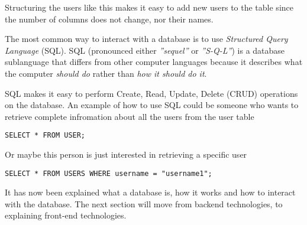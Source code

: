 \documentclass[../../master.tex]{subfiles}
\begin{document}
Structuring the users like this makes it easy to add new users to the table since the number of columns does not change, nor their names.

The most common way to interact with a database is to use \textit{Structured Query Language} (SQL).
SQL (pronounced either \textit{''sequel''} or \textit{''S-Q-L''}) is a database sublanguage that differs from other computer languages because it describes what the computer \textit{should do} rather than \textit{how it should do it}.\cite{SQLIntroduction}

SQL makes it easy to perform Create, Read, Update, Delete (CRUD) operations on the database.\cite{OracleWhatIsDatabase}
An example of how to use SQL could be someone who wants to retrieve complete infromation about all the users from the user table

\begin{lstlisting}[caption={An SQL query that fetches complete information for every user}, label=lstSQL-user1]
SELECT * FROM USER;
\end{lstlisting}

Or maybe this person is just interested in retrieving a specific user

\begin{lstlisting}[caption={An SQL query that only fetches complete information for username1}, label=lstSQL-user2]
SELECT * FROM USERS WHERE username = "username1";
\end{lstlisting}

It has now been explained what a database is, how it works and how to interact with the database.
The next section will move from backend technologies, to explaining front-end technologies.
\end{document}
